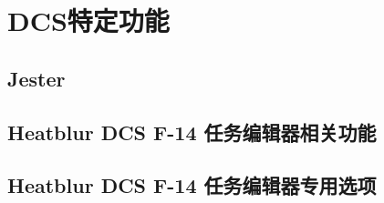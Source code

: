 
\chapter{DCS特定功能}

\section{Jester}

\section{Heatblur DCS F-14 任务编辑器相关功能}

\section{Heatblur DCS F-14 任务编辑器专用选项}